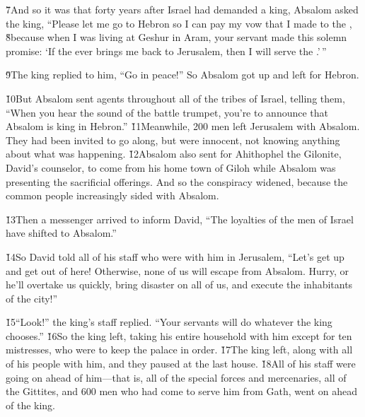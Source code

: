 \v{7}And so it was that forty years after Israel had demanded a king, Absalom asked the king, ``Please let me go to Hebron so I can pay my vow that I made to the , \v{8}because when I was living at Geshur in Aram, your servant made this solemn promise: `If the  ever brings me back to Jerusalem, then I will serve the .'\,''

\v{9}The king replied to him, ``Go in peace!'' So Absalom got up and left for Hebron.

\v{10}But Absalom sent agents throughout all of the tribes of Israel, telling them, ``When you hear the sound of the battle trumpet, you're to announce that Absalom is king in Hebron.'' \v{11}Meanwhile, 200 men left Jerusalem with Absalom. They had been invited to go along, but were innocent, not knowing anything about what was happening. \v{12}Absalom also sent for Ahithophel the Gilonite, David's counselor, to come from his home town of Giloh while Absalom was presenting the sacrificial offerings. And so the conspiracy widened, because the common people increasingly sided with Absalom.

\v{13}Then a messenger arrived to inform David, ``The loyalties of the men of Israel have shifted to Absalom.''

\v{14}So David told all of his staff who were with him in Jerusalem, ``Let's get up and get out of here! Otherwise, none of us will escape from Absalom. Hurry, or he'll overtake us quickly, bring disaster on all of us, and execute the inhabitants of the city!''

\v{15}``Look!'' the king's staff replied. ``Your servants will do whatever the king chooses.'' \v{16}So the king left, taking his entire household with him except for ten mistresses, who were to keep the palace in order. \v{17}The king left, along with all of his people with him, and they paused at the last house. \v{18}All of his staff were going on ahead of him---that is, all of the special forces and mercenaries, all of the Gittites, and 600 men who had come to serve him from Gath, went on ahead of the king.


